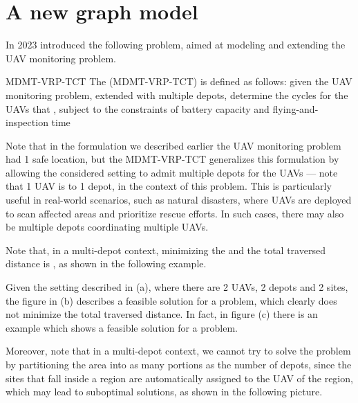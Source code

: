 \documentclass[a4paper, 12pt]{report}
\begin{document}
    \section{A new graph model}

    In 2023 \textcite{calamoneri} introduced the following problem, aimed at modeling and extending the UAV monitoring problem.

    \begin{frameddefn}{MDMT-VRP-TCT}
        The  (MDMT-VRP-TCT) is defined as follows: given the UAV monitoring problem, extended with multiple depots, determine the cycles for the UAVs that , subject to the constraints of battery capacity and flying-and-inspection time
    \end{frameddefn}
    
    Note that in the formulation we described earlier the UAV monitoring problem had 1 safe location, but the MDMT-VRP-TCT generalizes this formulation by allowing the considered setting to admit multiple depots for the UAVs --- note that 1 UAV is  to 1 depot, in the context of this problem. This is particularly useful in real-world scenarios, such as natural disasters, where UAVs are deployed to scan affected areas and prioritize rescue efforts. In such cases, there may also be multiple depots coordinating multiple UAVs.

    Note that, in a multi-depot context, minimizing the  and the total traversed distance is , as shown in the following example.


    Given the setting described in (a), where there are 2 UAVs, 2 depots and 2 sites, the figure in (b) describes a feasible solution for a  problem, which clearly does not minimize the total traversed distance. In fact, in figure (c) there is an example which shows a feasible solution for a  problem.

    Moreover, note that in a multi-depot context, we cannot try to solve the problem by partitioning the area into as many portions as the number of depots, since the sites that fall inside a region are automatically assigned to the UAV of the region, which may lead to suboptimal solutions, as shown in the following picture.
\end{document}
